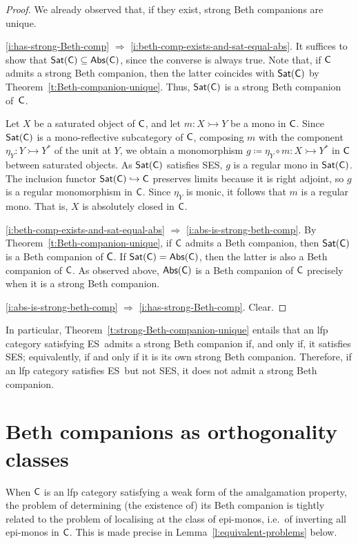 \documentclass[a4paper,10pt,reqno]{amsart}
\theoremstyle{definition}
\theoremstyle{remark}
\newcommand{\cat}{{\sf C}}								%
\newcommand{\Sat}{{\sf Sat}}								%
\newcommand{\Abs}{{\sf Abs}}								%
\newcommand{\into}{\hookrightarrow}						%
\newcommand{\emb}{\rightarrowtail}							%
\newcommand{\IMP}{\Rightarrow}						%
\newcommand{\ES}{\textnormal{ES}}
\newcommand{\SES}{\textnormal{SES}}
\begin{document}
\begin{proof}
We already observed that, if they exist, strong Beth companions are unique.

\ref{i:has-strong-Beth-comp} $\IMP$ \ref{i:beth-comp-exists-and-sat-equal-abs}. It suffices to show that $\Sat(\cat)\subseteq\Abs(\cat)$, since the converse is always true. Note that, if $\cat$ admits a strong Beth companion, then the latter coincides with $\Sat(\cat)$ by Theorem~\ref{t:Beth-companion-unique}. Thus, $\Sat(\cat)$ is a strong Beth companion of~$\cat$.

Let $X$ be a saturated object of $\cat$, and let $m\colon X\emb Y$ be a mono in $\cat$. Since $\Sat(\cat)$ is a  mono-reflective subcategory of $\cat$, composing $m$ with the component $\eta_{Y}\colon Y \emb Y^{*}$ of the unit at $Y$, we obtain a monomorphism $g\coloneqq \eta_{Y}\circ m \colon X\emb Y^{*}$ in $\cat$ between saturated objects. As $\Sat(\cat)$ satisfies \SES, $g$ is a regular mono in $\Sat(\cat)$. The inclusion functor $\Sat(\cat)\into\cat$ preserves limits because it is right adjoint, so $g$ is a regular monomorphism in $\cat$. Since $\eta_{Y}$ is monic, it follows that $m$ is a regular mono. That is, $X$ is absolutely closed in $\cat$.

\ref{i:beth-comp-exists-and-sat-equal-abs} $\IMP$ \ref{i:abs-is-strong-beth-comp}. By Theorem~\ref{t:Beth-companion-unique}, if $\cat$ admits a Beth companion, then $\Sat(\cat)$ is a Beth companion of $\cat$. If $\Sat(\cat)=\Abs(\cat)$, then the latter is also a Beth companion of $\cat$. As observed above, $\Abs(\cat)$ is a Beth companion of $\cat$ precisely when it is a strong Beth companion. 

\ref{i:abs-is-strong-beth-comp} $\IMP$ \ref{i:has-strong-Beth-comp}. Clear.
\end{proof}

In particular, Theorem~\ref{t:strong-Beth-companion-unique} entails that an lfp category satisfying \ES~admits a strong Beth companion if, and only if, it satisfies \SES; equivalently, if and only if it is its own strong Beth companion. Therefore, if an lfp category satisfies \ES~but not \SES, it does not admit a strong Beth companion.


\section{Beth companions as orthogonality classes}\label{s:ort-classes-as-Beth-companions}

When $\cat$ is an lfp category satisfying a weak form of the amalgamation property, the problem of determining (the existence of) its Beth companion is tightly related to the problem of localising at the class of epi-monos, i.e.\ of inverting all epi-monos in $\cat$. This is made precise in Lemma~\ref{l:equivalent-problems} below. 
\end{document}
